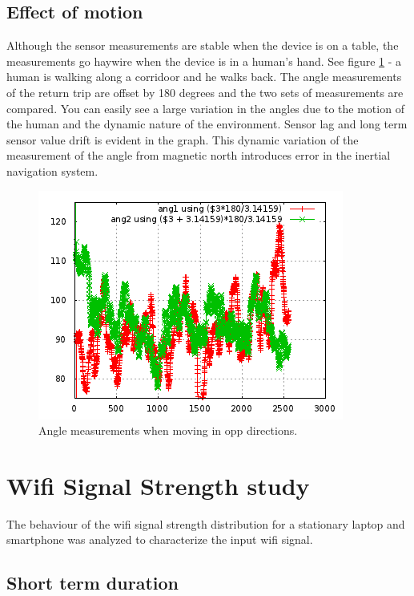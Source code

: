 \subsection{Effect of motion}

Although the sensor measurements are stable when the device is on a table,
the measurements go haywire when the device is in a human's hand. See figure
\ref{fig:angle_180_corridoor} - a human is walking along a corridoor and he walks
back. The angle measurements of the return trip are offset by 180 degrees and
the two sets of measurements are compared. You can easily see a large variation
in the angles due to the motion of the human and the dynamic nature of the environment.
Sensor lag and long term sensor value drift is evident in the graph.
This dynamic variation of the measurement of the angle from magnetic north 
introduces error in the inertial navigation system.

\begin{figure}\centering
    \includegraphics{figures/angle_180_corridoor.png}
    \caption{Angle measurements when moving in opp directions.\label{fig:angle_180_corridoor}}
\end{figure}



\section{Wifi Signal Strength study}

The behaviour of the wifi signal strength distribution for a stationary laptop 
and smartphone was analyzed to characterize the input wifi signal.

\subsection{Short term duration}

